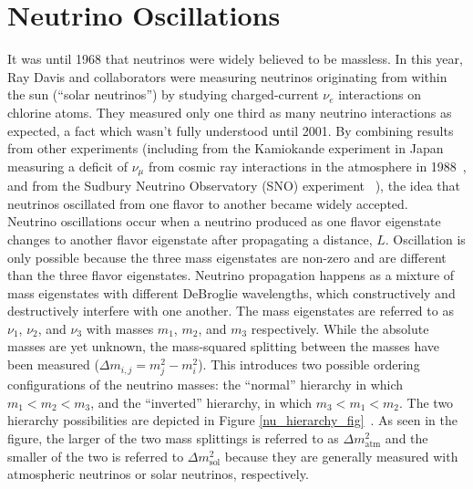 \section{Neutrino Oscillations}
It was until 1968 that neutrinos were widely believed to be massless. In this year, Ray Davis and collaborators were measuring neutrinos originating from within the sun (``solar neutrinos'') by studying charged-current $\nu_e$ interactions on chlorine atoms. They measured only one third as many neutrino interactions as expected, a fact which wasn't fully understood until 2001. By combining results from other experiments (including from the Kamiokande experiment in Japan measuring a deficit of $\nu_\mu$ from cosmic ray interactions in the atmosphere in 1988~\cite{KamiokandeOscsource}, and from the Sudbury Neutrino Observatory (SNO) experiment ~\cite{SNOOscsource}), the idea that neutrinos oscillated from one flavor to another became widely accepted.\\

Neutrino oscillations occur when a neutrino produced as one flavor eigenstate changes to another flavor eigenstate after propagating a distance, $L$. Oscillation is only possible because the three mass eigenstates are non-zero and are different than the three flavor eigenstates. Neutrino propagation happens as a mixture of mass eigenstates with different DeBroglie wavelengths, which constructively and destructively interfere with one another. The mass eigenstates are referred to as $\nu_1$, $\nu_2$, and $\nu_3$ with masses $m_1$, $m_2$, and $m_3$ respectively. While the absolute masses are yet unknown, the mass-squared splitting between the masses have been measured ($\Delta m_{i,j} = m_j^2-m_i^2$). This introduces two possible ordering configurations of the neutrino masses: the ``normal'' hierarchy in which $m_1<m_2<m_3$, and the ``inverted'' hierarchy, in which $m_3<m_1<m_2$. The two hierarchy possibilities are depicted in Figure \ref{nu_hierarchy_fig}~\cite{HierarchyFigsource}. As seen in the figure, the larger of the two mass splittings is referred to as $\Delta m^2_{\text{atm}}$ and the smaller of the two is referred to $\Delta m^2_{\text{sol}}$ because they are generally measured with atmospheric neutrinos or solar neutrinos, respectively.\\

